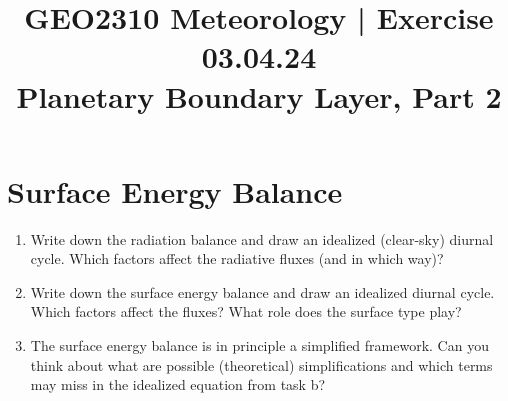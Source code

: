 \documentclass{article}
\begin{document}
\title{GEO2310 Meteorology | Exercise 03.04.24\\ Planetary Boundary Layer, Part 2 }
\date{}
\maketitle

\vspace{-1.3cm}

\section{Surface Energy Balance}
\begin{enumerate}[label=(\alph*)]
    \item Write down the radiation balance and draw an idealized (clear-sky) diurnal cycle. Which factors affect the radiative fluxes (and in which way)? %
    \item Write down the surface energy balance and draw an idealized diurnal cycle. Which factors affect the fluxes? What role does the surface type play? %
    \item The surface energy balance is in principle a simplified framework. Can you think about what are possible (theoretical) simplifications and which terms may miss in the idealized equation from task b? %

\end{enumerate}
\end{document}
